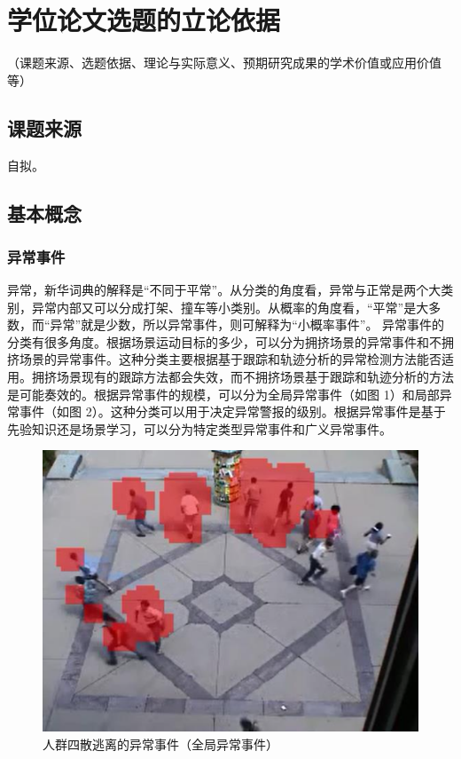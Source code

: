 

\section{学位论文选题的立论依据}

（课题来源、选题依据、理论与实际意义、预期研究成果的学术价值或应用价值等）

\subsection{课题来源}
自拟。


\subsection{基本概念}
\subsubsection{异常事件}
异常，新华词典的解释是“不同于平常”。从分类的角度看，异常与正常是两个大类别，异常内部又可以分成打架、撞车等小类别。从概率的角度看，“平常”是大多数，而“异常”就是少数，所以异常事件，则可解释为“小概率事件”。
    异常事件的分类有很多角度。根据场景运动目标的多少，可以分为拥挤场景的异常事件和不拥挤场景的异常事件。这种分类主要根据基于跟踪和轨迹分析的异常检测方法能否适用。拥挤场景现有的跟踪方法都会失效，而不拥挤场景基于跟踪和轨迹分析的方法是可能奏效的。根据异常事件的规模，可以分为全局异常事件（如图 1）和局部异常事件（如图 2）。这种分类可以用于决定异常警报的级别。根据异常事件是基于先验知识还是场景学习，可以分为特定类型异常事件和广义异常事件。


\begin{figure}
    \centering
	\includegraphics[width=0.7\linewidth]{fig1}
	\caption{人群四散逃离的异常事件（全局异常事件）}
	\label{fig:fig1}
\end{figure}

